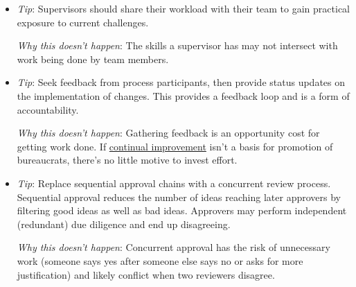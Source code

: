 \begin{itemize}
    \item \textit{Tip}: Supervisors should share their workload with their team to gain practical exposure to current challenges.

    \textit{Why this doesn't happen}: The skills a supervisor has may not intersect with work being done by team members. 
    
    \item \textit{Tip}: Seek feedback from process participants, then provide status updates on the implementation of changes. This provides a feedback loop and is a form of accountability.

    \textit{Why this doesn't happen}: Gathering feedback is an opportunity cost for getting work done. If \href{https://en.wikipedia.org/wiki/Continual_improvement_process}{continual improvement}
    isn't a basis for promotion of bureaucrats, there's no little motive to invest effort.
    
    \item \textit{Tip}: Replace sequential approval chains with a concurrent review process. Sequential approval reduces the number of ideas reaching later approvers by filtering good ideas as well as bad ideas. Approvers may perform independent (redundant) due diligence and end up disagreeing. 
    
    \textit{Why this doesn't happen}: Concurrent approval has the risk of unnecessary work (someone says yes after someone else says no or asks for more justification) and likely conflict when two reviewers disagree. 
\end{itemize}
